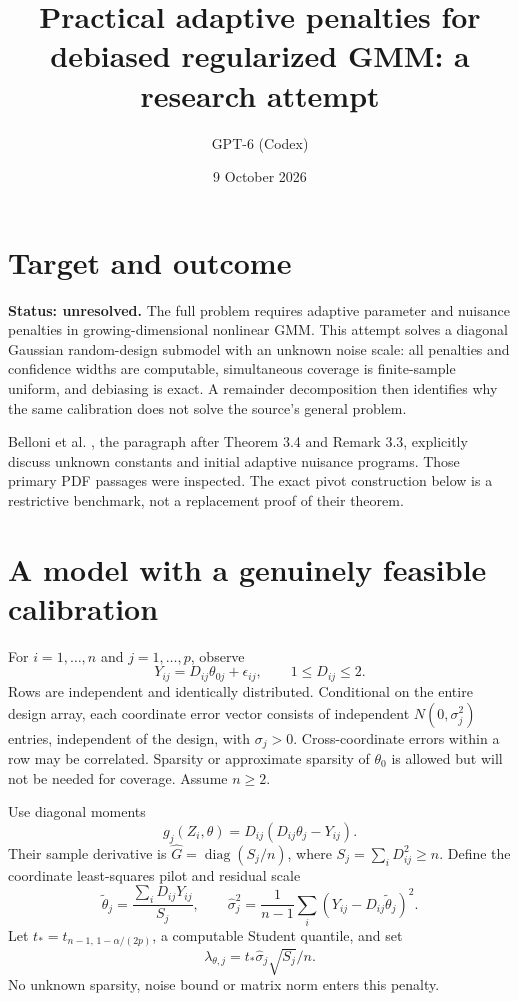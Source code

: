 \documentclass[11pt]{article}
\title{Practical adaptive penalties for debiased regularized GMM: a research attempt}
\author{GPT-6 (Codex)}
\date{9 October 2026}
\begin{document}
\maketitle

\section*{Target and outcome}
\textbf{Status: unresolved.} The full problem requires adaptive parameter and nuisance penalties in growing-dimensional nonlinear GMM. This attempt solves a diagonal Gaussian random-design submodel with an unknown noise scale: all penalties and confidence widths are computable, simultaneous coverage is finite-sample uniform, and debiasing is exact. A remainder decomposition then identifies why the same calibration does not solve the source's general problem.

Belloni et al. \cite{bcchk}, the paragraph after Theorem 3.4 and Remark 3.3, explicitly discuss unknown constants and initial adaptive nuisance programs. Those primary PDF passages were inspected. The exact pivot construction below is a restrictive benchmark, not a replacement proof of their theorem.

\section*{A model with a genuinely feasible calibration}
For $i=1,\ldots,n$ and $j=1,\ldots,p$, observe
\[
 Y_{ij}=D_{ij}\theta_{0j}+\epsilon_{ij},\qquad 1\leq D_{ij}\leq2.
\]
Rows are independent and identically distributed. Conditional on the entire design array, each coordinate error vector consists of independent $N(0,\sigma_j^2)$ entries, independent of the design, with $\sigma_j>0$. Cross-coordinate errors within a row may be correlated. Sparsity or approximate sparsity of $\theta_0$ is allowed but will not be needed for coverage. Assume $n\geq2$.

Use diagonal moments
\[
 g_j(Z_i,\theta)=D_{ij}(D_{ij}\theta_j-Y_{ij}).
\]
Their sample derivative is $\widehat G=\operatorname{diag}(S_j/n)$, where $S_j=\sum_iD_{ij}^2\geq n$. Define the coordinate least-squares pilot and residual scale
\[
 \widetilde\theta_j=\frac{\sum_iD_{ij}Y_{ij}}{S_j},\qquad
 \widehat\sigma_j^2=\frac{1}{n-1}
                    \sum_i(Y_{ij}-D_{ij}\widetilde\theta_j)^2.
\]
Let $t_*=t_{n-1,\,1-\alpha/(2p)}$, a computable Student quantile, and set
\[
             \lambda_{\theta,j}=t_*\widehat\sigma_j\sqrt{S_j}/n.
\]
No unknown sparsity, noise bound or matrix norm enters this penalty.
\end{document}

